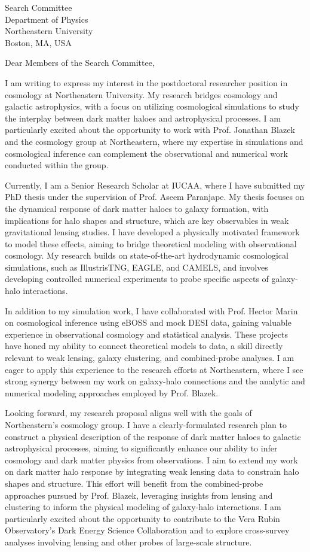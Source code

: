 \documentclass[11pt]{letter}
\begin{document}
\begin{letter}{Search Committee \\ Department of Physics \\ Northeastern University \\ Boston, MA, USA}

\opening{Dear Members of the Search Committee,}

I am writing to express my interest in the postdoctoral researcher position in cosmology at Northeastern University. My research bridges cosmology and galactic astrophysics, with a focus on utilizing cosmological simulations to study the interplay between dark matter haloes and astrophysical processes. I am particularly excited about the opportunity to work with Prof. Jonathan Blazek and the cosmology group at Northeastern, where my expertise in simulations and cosmological inference can complement the observational and numerical work conducted within the group.

Currently, I am a Senior Research Scholar at IUCAA, where I have submitted my PhD thesis under the supervision of Prof. Aseem Paranjape. My thesis focuses on the dynamical response of dark matter haloes to galaxy formation, with implications for halo shapes and structure, which are key observables in weak gravitational lensing studies. I have developed a physically motivated framework to model these effects, aiming to bridge theoretical modeling with observational cosmology. My research builds on state-of-the-art hydrodynamic cosmological simulations, such as IllustrisTNG, EAGLE, and CAMELS, and involves developing controlled numerical experiments to probe specific aspects of galaxy-halo interactions.

In addition to my simulation work, I have collaborated with Prof. Hector Marin on cosmological inference using eBOSS and mock DESI data, gaining valuable experience in observational cosmology and statistical analysis. These projects have honed my ability to connect theoretical models to data, a skill directly relevant to weak lensing, galaxy clustering, and combined-probe analyses. I am eager to apply this experience to the research efforts at Northeastern, where I see strong synergy between my work on galaxy-halo connections and the analytic and numerical modeling approaches employed by Prof. Blazek.

Looking forward, my research proposal aligns well with the goals of Northeastern’s cosmology group. I have a clearly-formulated research plan to construct a physical description of the response of dark matter haloes to galactic astrophysical processes, aiming to significantly enhance our ability to infer cosmology and dark matter physics from observations. I aim to extend my work on dark matter halo response by integrating weak lensing data to constrain halo shapes and structure. This effort will benefit from the combined-probe approaches pursued by Prof. Blazek, leveraging insights from lensing and clustering to inform the physical modeling of galaxy-halo interactions. I am particularly excited about the opportunity to contribute to the Vera Rubin Observatory’s Dark Energy Science Collaboration and to explore cross-survey analyses involving lensing and other probes of large-scale structure.


\end{letter}
\end{document}
